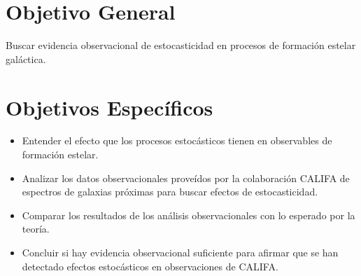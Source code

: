 \documentclass[12pt]{article}
\begin{document}






\section{Objetivo General}

Buscar evidencia observacional de estocasticidad en procesos de
formaci\'on estelar gal\'actica.




\section{Objetivos Espec\'ificos}


\begin{itemize}
	\item Entender el efecto que los procesos estoc\'asticos
          tienen en observables de formaci\'on estelar.
	\item Analizar los datos observacionales prove\'idos por la
          colaboraci\'on CALIFA de espectros de galaxias pr\'oximas
          para buscar efectos de estocasticidad.
	\item Comparar los resultados de los an\'alisis
          observacionales con lo esperado por la teor\'ia.
        \item Concluir si hay evidencia observacional suficiente para
          afirmar que se han detectado efectos estoc\'asticos en
          observaciones de CALIFA.
\end{itemize}
\end{document}
